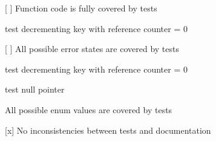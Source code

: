 \begin{DoxyItemize}
\item \mbox{[} \mbox{]} Function code is fully covered by tests
\begin{DoxyItemize}
\item test decrementing key with reference counter = 0
\end{DoxyItemize}
\item \mbox{[} \mbox{]} All possible error states are covered by tests
\begin{DoxyItemize}
\item test decrementing key with reference counter = 0
\item test null pointer
\end{DoxyItemize}
\item All possible enum values are covered by tests
\item \mbox{[}x\mbox{]} No inconsistencies between tests and documentation
\end{DoxyItemize}